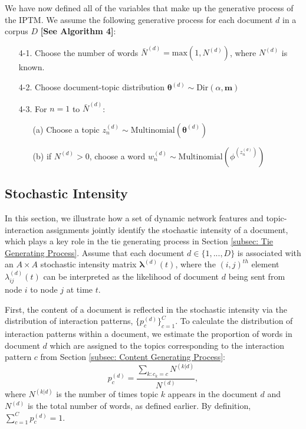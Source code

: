 \documentclass[a4paper]{article}
\begin{document}
 We have now defined all of the variables that make up the generative process of the IPTM. We assume the following generative process for each document $d$ in a corpus $D$ \textbf{[See Algorithm 4]}:
\begin{itemize}
	\item[4-1.] Choose the number of words $\bar N^{(d)} = \mbox{max}(1,  N^{(d)})$, where $N^{(d)}$ is known.
	\item[4-2.] Choose document-topic distribution $\boldsymbol{\theta}^{(d)}\sim \mbox{Dir}(\alpha, \boldsymbol{m})$
	\item[4-3.] For $n=1$ to $\bar N^{(d)}$:
	\begin{itemize}
		\item[(a)] Choose a topic $z_n^{(d)} \sim \mbox{Multinomial}(\boldsymbol{\theta}^{(d)})$
		\item[(b)] if $N^{(d)}>0$, choose a word $w_n^{(d)} \sim\mbox{Multinomial} (\phi^{(z_n^{(d)})})$
	\end{itemize}
\end{itemize}
\subsection{Stochastic Intensity} \label{subsec: Stochastic Intensity}
In this section, we illustrate how a set of dynamic network features and topic-interaction assignments jointly identify the stochastic intensity of a document, which plays a key role in the tie generating process in Section \ref{subsec: Tie Generating Process}. Assume that each document $d \in \{1,...,D\}$ is associated with an $A\times A$ stochastic intensity matrix $\boldsymbol{\lambda}^{(d)}(t)$, where the $(i, j)^{th}$ element $\lambda^{(d)}_{ij}(t)$ can be interpreted as the likelihood of document $d$ being sent from node $i$ to node $j$ at time $t$.  

First, the content of a document is reflected in the stochastic intensity via the distribution of interaction patterns, $\{p_c^{(d)}\}_{c=1}^C$. To calculate the distribution of interaction patterns within a document, we estimate the proportion of words in document $d$ which are assigned to the topics corresponding to the interaction pattern $c$ from Section \ref{subsec: Content Generating Process}: 
\begin{equation}
p_c^{(d)} = \frac{\sum\limits_{k: c_k=c} N^{(k|d)}}{N^{(d)}},
\end{equation}
where $N^{(k|d)}$ is the number of times topic $k$ appears in the document $d$ and $N^{(d)}$ is the total number of words, as defined earlier. By definition, $\sum\limits_{c=1}^{C}p_c^{(d)}=1$.
\end{document}
